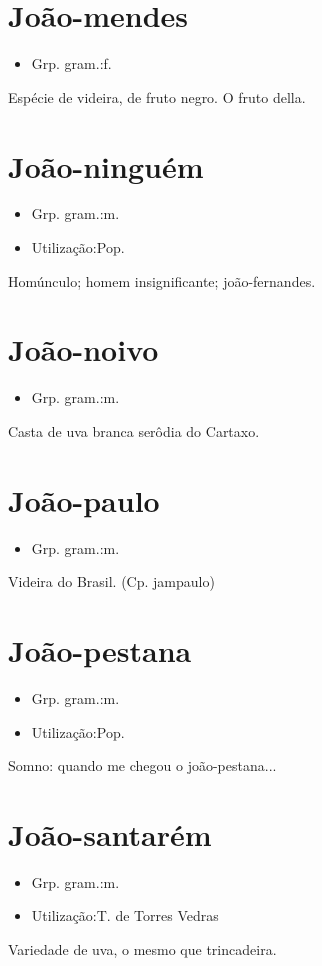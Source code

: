 \documentclass{article}
\begin{document}
\section{João-mendes}
\begin{itemize}
\item {Grp. gram.:f.}
\end{itemize}
Espécie de videira, de fruto negro.
O fruto della.
\section{João-ninguém}
\begin{itemize}
\item {Grp. gram.:m.}
\end{itemize}
\begin{itemize}
\item {Utilização:Pop.}
\end{itemize}
Homúnculo; homem insignificante; joão-fernandes.
\section{João-noivo}
\begin{itemize}
\item {Grp. gram.:m.}
\end{itemize}
Casta de uva branca serôdia do Cartaxo.
\section{João-paulo}
\begin{itemize}
\item {Grp. gram.:m.}
\end{itemize}
Videira do Brasil.
(Cp. \textunderscore jampaulo\textunderscore )
\section{João-pestana}
\begin{itemize}
\item {Grp. gram.:m.}
\end{itemize}
\begin{itemize}
\item {Utilização:Pop.}
\end{itemize}
Somno: \textunderscore quando me chegou o joão-pestana...\textunderscore 
\section{João-santarém}
\begin{itemize}
\item {Grp. gram.:m.}
\end{itemize}
\begin{itemize}
\item {Utilização:T. de Torres Vedras}
\end{itemize}
Variedade de uva, o mesmo que \textunderscore trincadeira\textunderscore .
\end{document}
